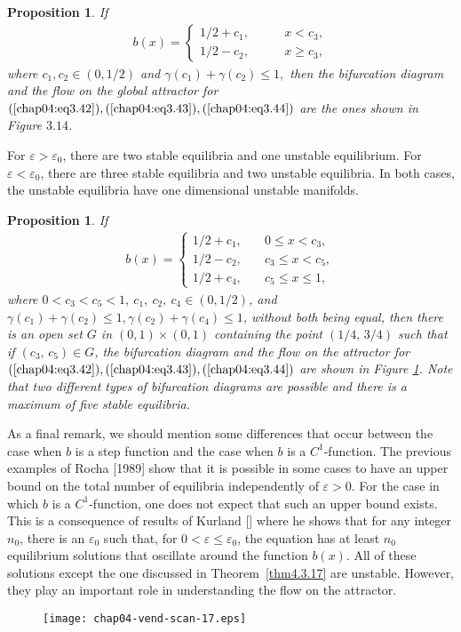 \documentclass{surv-l}
\theoremstyle{plain}
\newtheorem{proposition}[theorem]{Proposition}
\theoremstyle{definition}
\numberwithin{equation}{section}
\numberwithin{figure}{chapter}
\begin{document}
\begin{proposition}\label{pro4.3.18} If
\begin{align*}
b(x)=\left\{\begin{array}{ll}
1/2+c_{1},& \qquad x < c_{3},\\
1/2-c_{2},& \qquad x\geq c_{3},
\end{array}\right.
\end{align*}
where $c_{1},c_{2}\in(0,1/2)$ and $\gamma(c_{1})+\gamma(c_{2})\leq 1,$ then the bifurcation diagram and the flow on the global attractor for $(\ref{chap04:eq3.42}), (\ref{chap04:eq3.43}), (\ref{chap04:eq3.44})$ are the ones shown in Figure $3.14$.
\end{proposition}

For $\varepsilon >\varepsilon_{0}$, there are two stable equilibria and one unstable equilibrium. For $\varepsilon <\varepsilon_{0}$, there are three stable equilibria and two unstable equilibria. In both cases, the unstable equilibria have one dimensional unstable manifolds.

\begin{proposition}\label{pro4.3.19} If
\begin{align*}
b(x)=\left\{\begin{array}{lll}
1/2+c_{1},& \quad 0\leq x<c_{3},\\
1/2-c_{2},& \quad c_{3}\leq x<c_{5},\\
1/2+c_{4},& \quad c_{5}\leq x\leq 1,
\end{array}\right.
\end{align*}
where $0<c_{3}<c_{5}<1,\ c_{1},\ c_{2},\ c_{4}\in(0,1/2)$, and $\gamma(c_{1})+\gamma(c_{2})\leq 1, \gamma(c_{2})+\gamma(c_{4})\leq 1$, without both being equal, then there is an open set $G$ in $(0,1)\times(0,1)$ containing the point $(1/4,\, 3/4)$ such that if $(c_{3},\,c_{5})\in G$, the bifurcation diagram and the flow on the attractor for $(\ref{chap04:eq3.42}), (\ref{chap04:eq3.43}), (\ref{chap04:eq3.44})$ are shown in Figure \ref{fig3.15}. Note that two different types of bifurcation diagrams are possible and there is a maximum of five stable equilibria.
\end{proposition}

As a final remark, we should mention some differences that occur between the case when $b$ is a step function and the case when $b$ is a $C^{1}$-function. The previous examples of Rocha [1989] show that it is possible in some cases to have an upper bound on the total number of equilibria independently of $\varepsilon>0$. For the case in which $b$ is a $C^{1}$-function, one does not expect that such an upper bound exists. This is a consequence of results of Kurland [\citeyear{1983k}] where he shows that for any integer $n_{0}$, there is an $\varepsilon_{0}$ such that, for $0<\varepsilon\leq\varepsilon_{0}$, the equation has at least $n_{0}$ equilibrium solutions that oscillate around the function $b(x)$. All of these solutions except the one discussed in Theorem~\ref{thm4.3.17} are unstable. However, they play an important role in understanding the flow on the attractor.
\begin{figure}
\texttt{[image: chap04-vend-scan-17.eps]}
\caption{}\label{fig3.15}
\end{figure}
\end{document}
